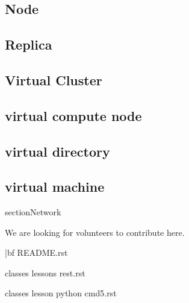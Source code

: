 \documentclass[9pt,twocolumn,twoside]{styles/osajnl}
\begin{document}


\subsection{Node}



\subsection{Replica}



\subsection{Virtual Cluster}



\subsection{virtual compute node}



\subsection{virtual directory}



\subsection{virtual machine}


section{Network}

We are looking for volunteers to contribute here.

\appendix

{|bf README.rst}

classes lessons rest.rst

classes lesson python cmd5.rst

\end{document}
